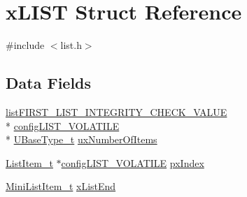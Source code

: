\hypertarget{structxLIST}{\section{x\-L\-I\-S\-T Struct Reference}
\label{structxLIST}
}


{\ttfamily \#include $<$list.\-h$>$}

\subsection*{Data Fields}
\begin{DoxyCompactItemize}
\item 
\hyperlink{list_8h_a3a52b5a4f70d3a07e37a5814a23ba880}{list\-F\-I\-R\-S\-T\-\_\-\-L\-I\-S\-T\-\_\-\-I\-N\-T\-E\-G\-R\-I\-T\-Y\-\_\-\-C\-H\-E\-C\-K\-\_\-\-V\-A\-L\-U\-E} \\*
\hyperlink{list_8h_a2d5de557c5561c8980d1bf51d87d8cba}{config\-L\-I\-S\-T\-\_\-\-V\-O\-L\-A\-T\-I\-L\-E} \\*
\hyperlink{Flsh186_2prtmacro_8h_a8e88a5e44a5243b3d1c29af17fd6b5bd}{U\-Base\-Type\-\_\-t} \hyperlink{structxLIST_aa5cb7cdc699e1252af0441e46e427a03}{ux\-Number\-Of\-Items}
\item 
\hyperlink{list_8h_a1a62d469392f9bfe2443e7efab9c8398}{List\-Item\-\_\-t} $\ast$\hyperlink{list_8h_a2d5de557c5561c8980d1bf51d87d8cba}{config\-L\-I\-S\-T\-\_\-\-V\-O\-L\-A\-T\-I\-L\-E} \hyperlink{structxLIST_a7bf64d87701493b4c8c5c977682500d7}{px\-Index}
\item 
\hyperlink{list_8h_a542a8d55e98bc407593979e61f83cd02}{Mini\-List\-Item\-\_\-t} \hyperlink{structxLIST_a49ad62fa153126e27e273811167b336a}{x\-List\-End}
\end{DoxyCompactItemize}


